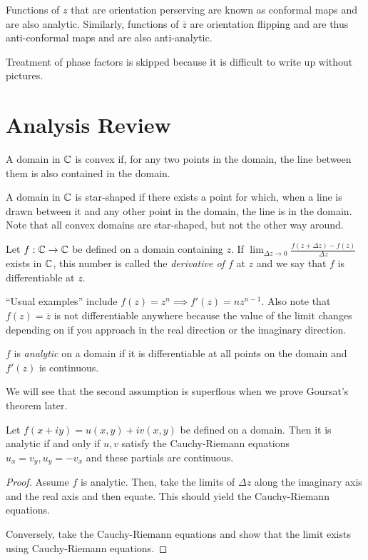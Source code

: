 \documentclass[11pt,leqno,oneside]{amsart}
\begin{document}
\begin{defn}
    Functions of $z$ that are orientation perserving are known as conformal
    maps and are also analytic. Similarly, functions of $\overline{z}$ are
    orientation flipping and are thus anti-conformal maps and are also
    anti-analytic.
\end{defn}

Treatment of phase factors is skipped because it is difficult to write up
without pictures.

\section*{Analysis Review}

\begin{defn}
A domain in ${\mathbb C}$ is convex if, for any two points in the domain, the line
between them is also contained in the domain.
\end{defn}
\begin{defn}
    A domain in ${\mathbb C}$ is star-shaped if there exists a point for which, when a
    line is drawn between it and any other point in the domain, the line is in
    the domain. Note that all convex domains are star-shaped, but not the other
    way around.
\end{defn}
\begin{defn}
    Let $f: {\mathbb C} \to {\mathbb C}$ be defined on a domain containing $z$. If $\lim_{\Delta
    z \to 0} \frac{f(z+\Delta z) - f(z)}{\Delta z}$ exists in ${\mathbb C}$, this number
    is called the \emph{derivative of $f$} at $z$ and we say that $f$ is
    differentiable at $z$.
\end{defn}

``Usual examples'' include $f(z) = z^n \implies f'(z) = nz^{n-1}$. Also note
that $f(z) = \overline{z}$ is not differentiable anywhere because the value of
the limit changes depending on if you approach in the real direction or the
imaginary direction.
\begin{defn}
    $f$ is \emph{analytic} on a domain if it is differentiable at all points on
    the domain and $f'(z)$ is continuous.
\end{defn}
We will see that the second assumption is superflous when we prove Goursat's
theorem later.

\begin{thm}
    Let $f(x+iy) = u(x,y)+iv(x,y)$ be defined on a domain. Then it is analytic
    if and only if $u,v$ satisfy the Cauchy-Riemann equations $u_x = v_y, u_y =
    -v_x$ and these partials are continuous.
\end{thm}
\begin{proof}
    Assume $f$ is analytic. Then, take the limits of $\Delta z$ along the
    imaginary axis and the real axis and then equate. This should yield the
    Cauchy-Riemann equations.

    Conversely, take the Cauchy-Riemann equations and show that the limit
    exists using Cauchy-Riemann equations.
\end{proof}
\end{document}
